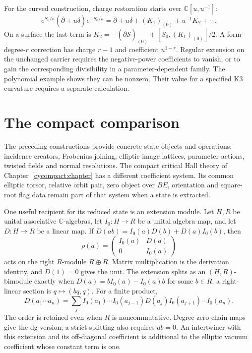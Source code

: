 For the curved construction, charge restoration
starts over $\mathbb C[u,u^{-1}]$:
\[
 e^{S_0/u}(\bar\partial+u\delta)e^{-S_0/u}
 =\bar\partial+u\delta+(K_1)_{(0)}+u^{-1}K_2+\cdots.
\]
On a surface the last term is
$K_2=-(\bar\partial\mathscr S)_{(0)}
+[S_0,(K_1)_{(0)}]/2$.
A form-degree-$r$ correction has charge
$r-1$ and coefficient $u^{1-r}$.
Regular extension on the unchanged carrier
requires the negative-power coefficients
to vanish, or to gain the corresponding
divisibility in a parameter-dependent family.
The polynomial example shows they can be
nonzero. Their value for a specified K3
curvature requires a separate calculation.

\section{The compact comparison}
\label{cyprim:sec:comparison}

The preceding constructions provide concrete
state objects and operations: incidence
creators, Frobenius joining, elliptic image
lattices, parameter actions, twisted fields
and normal resolutions. The compact critical
Hall theory of Chapter~\ref{cycompact:chapter}
has a different coefficient system. Its
common elliptic torsor, relative orbit pair,
zero object over $BE$, orientation and
square-root flag data remain part of that
system when a state is extracted.

One useful recipient for its reduced state
is an extension module. Let $H,R$ be unital associative
$\mathbb C$-algebras, let $I_0:H\to R$ be a unital
algebra map, and let $D:H\to R$ be a linear map. If
$D(ab)=I_0(a)D(b)+D(a)I_0(b)$, then
\begin{equation}\label{cyprim:eq:reduced-module}
 \rho(a)=\begin{pmatrix}I_0(a)&D(a)\\0&I_0(a)\end{pmatrix}
\end{equation}
acts on the right $R$-module $R\oplus R$.
Matrix multiplication is the derivation
identity, and $D(1)=0$ gives the unit.
The extension splits as an $(H,R)$-bimodule
exactly when $D(a)=bI_0(a)-I_0(a)b$ for
some $b\in R$: a right-linear section is
$q\mapsto(bq,q)$. For a finite product,
\[
 D(a_1\cdots a_n)=\sum_j
 I_0(a_1)\cdots I_0(a_{j-1})D(a_j)
 I_0(a_{j+1})\cdots I_0(a_n).
\]
The order is retained even when $R$ is
noncommutative. Degree-zero chain maps
give the dg version; a strict splitting
also requires $db=0$.
An intertwiner with this extension and its
off-diagonal coefficient is additional to
the elliptic vacuum coefficient whose
constant term is one.

